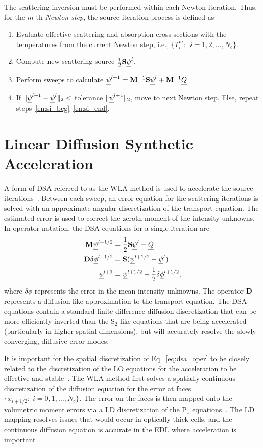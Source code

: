The scattering inversion must be
performed within each Newton iteration.  Thus, for the $m$-th \emph{Newton step}, the source
iteration process is defined as
\begin{enumerate}
    \item Evaluate effective scattering and absorption cross sections with the temperatures from the current Newton step, i.e., 
        ${\{T^m_i:\;\, i=1,2,\ldots,N_c\}}$.
    \item\label{en:si_beg} Compute new scattering source $\frac{1}{2}\mathbf{S} \underline{\psi}^l$.
    \item Perform sweeps to calculate $\underline{\psi}^{l+1} = \mathbf{M}^{-1} \mathbf{S}\underline{\psi}^{l} + \mathbf{M}^{-1} \underline{Q}$
    \item\label{en:si_end} If $\|\underline{\psi}^{l+1} - \underline{\psi}^{l} \|_2 < $ tolerance
        $\|\underline{\psi}^{l+1}\|_2$, move to next Newton step. Else, repeat steps~\ref{en:si_beg}--\ref{en:si_end}.
\end{enumerate}

\section{Linear Diffusion Synthetic Acceleration}

A form of DSA referred to as the WLA method is used to accelerate the source
iterations~\cite{wla,wla_thesis}. 
Between each sweep, an error equation for the scattering iterations is solved with an approximate angular
discretization of the transport equation.  The estimated error is used to correct the
zeroth moment of the intensity unknowns.  In operator notation, the DSA equations for a single
iteration are
\begin{align}
    \mathbf{M} \underline{\psi}^{l+1/2} &= \frac{1}{2}\mathbf{S} \underline{\psi}^{l} + \underline{Q} \\
    \mathbf{D} \delta \underline{\phi}^{l+1/2} &= \mathbf{S} (\underline{\psi}^{l+1/2} - \underline{\psi}^{l}) \label{eq:dsa_oper} \\
    \underline{\psi}^{l+1} &= \underline{\psi}^{l+1/2} + \frac{1}{2}\delta \underline{\phi}^{l+1/2},
\end{align}
where $\delta \phi$ represents the error in the mean intensity unknowns.
The operator $\mathbf{D}$ represents a diffusion-like approximation to the transport equation. The DSA equations contain a standard
finite-difference diffusion discretization that can be more efficiently
inverted than the S$_2$-like equations that are being accelerated (particularly in higher
spatial dimensions), but will accurately resolve the
slowly-converging, diffusive error modes. 

It is important for the spatial discretization of Eq.~\eqref{eq:dsa_oper} to be closely related to the discretization of the LO equations for the
acceleration to be effective and stable~\cite{adams_dsa}.  The WLA method first solves a spatially-continuous
discretization of the diffusion equation
for the error at faces $\{x_{i+1/2}:\; i=0,1,\ldots,N_c\}$.  The error on the faces is then mapped onto the
volumetric moment errors via a LD discretization of the P$_1$ equations~\cite{wla}.
The LD mapping resolves issues that would occur in optically-thick cells, and the
continuous diffusion equation is accurate in the EDL where acceleration is important~\cite{adams_dsa}.

